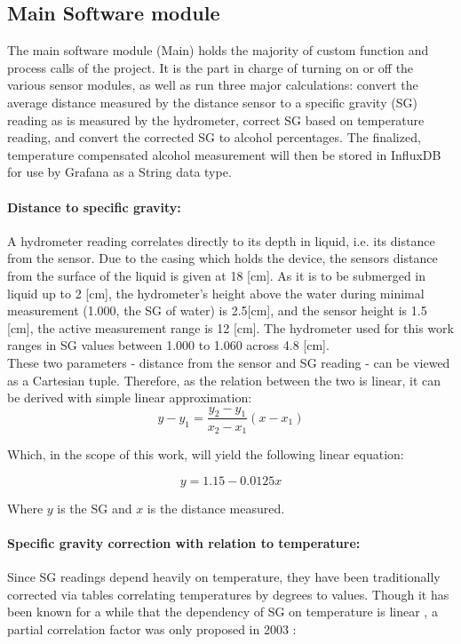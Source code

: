 \documentclass[twoside]{ctuthesis}
\theoremstyle{plain}
\theoremstyle{definition}
\theoremstyle{note}
\begin{document}
\subsection{Main Software module}
The main software module (Main) holds the majority of custom function and process calls of the project. It is the part in charge of turning on or off the various sensor modules, as well as run three major calculations: convert the average distance measured by the distance sensor to a specific gravity (SG) reading as is measured by the hydrometer, correct SG based on temperature reading, and convert the corrected SG to alcohol percentages. The finalized, temperature compensated alcohol measurement will then be stored in InfluxDB for use by Grafana as a String data type.

\paragraph{Distance to specific gravity:}
A hydrometer reading correlates directly to its depth in liquid, i.e. its distance from the sensor. Due to the casing which holds the device, the sensors distance from the surface of the liquid is given at 18 [cm]. As it is to be submerged in liquid up to 2 [cm], the hydrometer's height above the water during minimal measurement (1.000, the SG of water) is 2.5[cm], and the sensor height is 1.5 [cm], the active measurement range is 12 [cm]. The hydrometer used for this work ranges in SG values between 1.000 to 1.060 across 4.8 [cm].\\
These two parameters - distance from the sensor and SG reading - can be viewed as a Cartesian tuple. Therefore, as the relation between the two is linear, it can be derived with simple linear approximation:
\begin{equation}
y-y_1 = \frac{y_2 - y_1}{x_2 - x_1}(x - x_1)
\end{equation}

Which, in the scope of this work, will yield the following linear equation:

\begin{equation}
	y = 1.15 - 0.0125 x
\end{equation}

Where $y$ is the SG and $x$ is the distance measured.\\

\paragraph{Specific gravity correction with relation to temperature:}
Since SG readings depend heavily on temperature, they have been traditionally corrected via tables correlating temperatures by degrees to values. Though it has been known for a while that the dependency of SG on temperature is linear \cite{Temp_To_SG}, a partial correlation factor was only proposed in 2003 \cite{Joy_Of_Brewing}:
\end{document}
